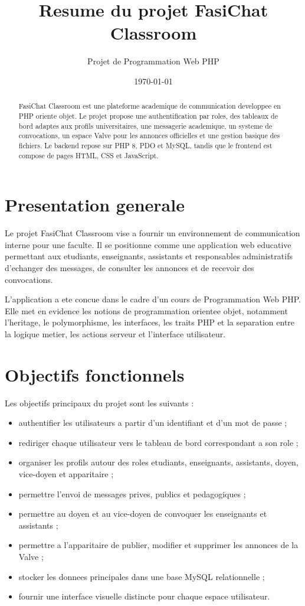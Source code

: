 \documentclass[12pt,a4paper]{article}
\title{\textbf{Resume du projet FasiChat Classroom}}
\author{Projet de Programmation Web PHP}
\date{\today}
\begin{document}
\maketitle

\begin{abstract}
FasiChat Classroom est une plateforme academique de communication developpee en PHP oriente objet. Le projet propose une authentification par roles, des tableaux de bord adaptes aux profils universitaires, une messagerie academique, un systeme de convocations, un espace \og Valve \fg{} pour les annonces officielles et une gestion basique des fichiers. Le backend repose sur PHP 8, PDO et MySQL, tandis que le frontend est compose de pages HTML, CSS et JavaScript.
\end{abstract}

\tableofcontents
\newpage

\section{Presentation generale}

Le projet FasiChat Classroom vise a fournir un environnement de communication interne pour une faculte. Il se positionne comme une application web educative permettant aux etudiants, enseignants, assistants et responsables administratifs d'echanger des messages, de consulter les annonces et de recevoir des convocations.

L'application a ete concue dans le cadre d'un cours de Programmation Web PHP. Elle met en evidence les notions de programmation orientee objet, notamment l'heritage, le polymorphisme, les interfaces, les traits PHP et la separation entre la logique metier, les actions serveur et l'interface utilisateur.

\section{Objectifs fonctionnels}

Les objectifs principaux du projet sont les suivants :

\begin{itemize}
    \item authentifier les utilisateurs a partir d'un identifiant et d'un mot de passe ;
    \item rediriger chaque utilisateur vers le tableau de bord correspondant a son role ;
    \item organiser les profils autour des roles etudiants, enseignants, assistants, doyen, vice-doyen et apparitaire ;
    \item permettre l'envoi de messages prives, publics et pedagogiques ;
    \item permettre au doyen et au vice-doyen de convoquer les enseignants et assistants ;
    \item permettre a l'apparitaire de publier, modifier et supprimer les annonces de la Valve ;
    \item stocker les donnees principales dans une base MySQL relationnelle ;
    \item fournir une interface visuelle distincte pour chaque espace utilisateur.
\end{itemize}
\end{document}
